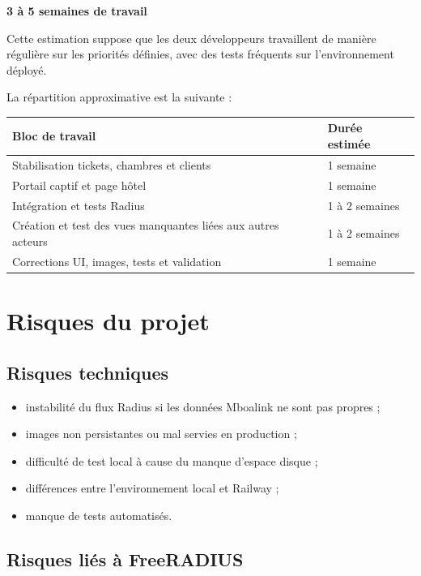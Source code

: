 \documentclass[12pt,a4paper]{article}
\begin{document}
\begin{center}
\textbf{3 à 5 semaines de travail}
\end{center}

Cette estimation suppose que les deux développeurs travaillent de manière régulière sur les priorités définies, avec des tests fréquents sur l'environnement déployé.

La répartition approximative est la suivante :

\begin{longtable}{|p{8cm}|p{4cm}|}
\hline
\textbf{Bloc de travail} & \textbf{Durée estimée} \\
\hline
Stabilisation tickets, chambres et clients & 1 semaine \\
\hline
Portail captif et page hôtel & 1 semaine \\
\hline
Intégration et tests Radius & 1 à 2 semaines \\
\hline
Création et test des vues manquantes liées aux autres acteurs & 1 à 2 semaines \\
\hline
Corrections UI, images, tests et validation & 1 semaine \\
\hline
\end{longtable}

\section{Risques du projet}

\subsection{Risques techniques}

\begin{itemize}
  \item instabilité du flux Radius si les données Mboalink ne sont pas propres ;
  \item images non persistantes ou mal servies en production ;
  \item difficulté de test local à cause du manque d'espace disque ;
  \item différences entre l'environnement local et Railway ;
  \item manque de tests automatisés.
\end{itemize}

\subsection{Risques liés à FreeRADIUS}
\end{document}
